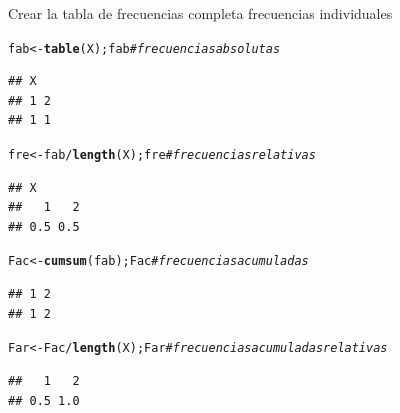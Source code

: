 \documentclass[10pt,a4paper]{article}\usepackage[]{graphicx}\usepackage[]{color}
\makeatletter
\newcommand{\hlcom}[1]{\textcolor[rgb]{0.678,0.584,0.686}{\textit{#1}}}%
\newcommand{\hlopt}[1]{\textcolor[rgb]{0,0,0}{#1}}%
\newcommand{\hlstd}[1]{\textcolor[rgb]{0.345,0.345,0.345}{#1}}%
\newcommand{\hlkwb}[1]{\textcolor[rgb]{0.69,0.353,0.396}{#1}}%
\newcommand{\hlkwd}[1]{\textcolor[rgb]{0.737,0.353,0.396}{\textbf{#1}}}%
\newenvironment{kframe}{%
 \def\at@end@of@kframe{}%
 \ifinner\ifhmode%
  \def\at@end@of@kframe{\end{minipage}}%
  \begin{minipage}{\columnwidth}%
 \fi\fi%
 \def\FrameCommand##1{\hskip\@totalleftmargin \hskip-\fboxsep
 \colorbox{shadecolor}{##1}\hskip-\fboxsep
     \hskip-\linewidth \hskip-\@totalleftmargin \hskip\columnwidth}%
 \MakeFramed {\advance\hsize-\width
   \@totalleftmargin\z@ \linewidth\hsize
   \@setminipage}}%
 {\par\unskip\endMakeFramed%
 \at@end@of@kframe}
\newenvironment{knitrout}{}{} %
\makeatother
\begin{document}
 Crear la tabla de frecuencias completa
 frecuencias individuales
\begin{knitrout}
\color{fgcolor}\begin{kframe}
\begin{alltt}
\hlstd{fab} \hlkwb{<-} \hlkwd{table}\hlstd{(X); fab} \hlcom{# frecuencias absolutas}
\end{alltt}
\begin{verbatim}
## X
## 1 2 
## 1 1
\end{verbatim}
\begin{alltt}
\hlstd{fre} \hlkwb{<-} \hlstd{fab}\hlopt{/}\hlkwd{length}\hlstd{(X); fre} \hlcom{# frecuencias relativas}
\end{alltt}
\begin{verbatim}
## X
##   1   2 
## 0.5 0.5
\end{verbatim}
\begin{alltt}
\hlstd{Fac} \hlkwb{<-} \hlkwd{cumsum}\hlstd{(fab); Fac} \hlcom{# frecuencias acumuladas}
\end{alltt}
\begin{verbatim}
## 1 2 
## 1 2
\end{verbatim}
\begin{alltt}
\hlstd{Far} \hlkwb{<-} \hlstd{Fac}\hlopt{/}\hlkwd{length}\hlstd{(X); Far} \hlcom{# frecuencias acumuladas relativas}
\end{alltt}
\begin{verbatim}
##   1   2 
## 0.5 1.0
\end{verbatim}
\end{kframe}
\end{knitrout}
\end{document}
